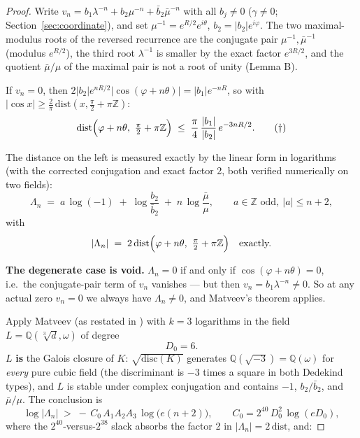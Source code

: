 \documentclass[11pt]{amsart}
\theoremstyle{plain}
\theoremstyle{remark}
\begin{document}
\begin{proof}
Write $v_n = b_1\lambda^{-n} + b_2\mu^{-n} + \bar b_2\bar\mu^{-n}$
with all $b_j \ne 0$ ($\gamma \ne 0$;
Section~\ref{sec:coordinate}), and set
$\mu^{-1} = e^{R/2}e^{i\theta}$, $b_2 = |b_2|e^{i\varphi}$. The two
maximal-modulus roots of the reversed recurrence are the conjugate
pair $\mu^{-1}, \bar\mu^{-1}$ (modulus $e^{R/2}$), the third root
$\lambda^{-1}$ is smaller by the exact factor $e^{3R/2}$, and the
quotient $\bar\mu/\mu$ of the maximal pair is not a root of unity
(Lemma B).

If $v_n = 0$, then
$2|b_2|e^{nR/2}|\cos(\varphi + n\theta)| = |b_1|e^{-nR}$, so with
$|\cos x| \ge \tfrac{2}{\pi}\,\mathrm{dist}(x, \tfrac{\pi}{2} +
\pi\mathbb{Z})$:
\begin{equation}
\mathrm{dist}\Bigl(\varphi + n\theta,\ \tfrac{\pi}{2} +
\pi\mathbb{Z}\Bigr)
\;\le\; \frac{\pi}{4}\,\frac{|b_1|}{|b_2|}\,e^{-3nR/2}.
\tag{$\dagger$}
\end{equation}

The distance on the left is measured exactly by the linear form in
logarithms (with the corrected conjugation and exact factor 2, both
verified numerically on two fields):
\[
\Lambda_n \;=\; a\,\log(-1) \;+\; \log\!\frac{b_2}{\bar b_2}
\;+\; n\,\log\!\frac{\bar\mu}{\mu},
\qquad a \in \mathbb{Z} \text{ odd},\ |a| \le n + 2,
\]
with
\[
|\Lambda_n| \;=\; 2\,\mathrm{dist}\Bigl(\varphi + n\theta,\
\tfrac{\pi}{2} + \pi\mathbb{Z}\Bigr)
\quad\text{exactly.}
\]

\textbf{The degenerate case is void.} $\Lambda_n = 0$ if and only if
$\cos(\varphi + n\theta) = 0$, i.e.\ the conjugate-pair term of $v_n$
vanishes --- but then $v_n = b_1\lambda^{-n} \ne 0$. So at any actual
zero $v_n = 0$ we always have $\Lambda_n \ne 0$, and Matveev's
theorem applies.

Apply Matveev \cite{Mat00} (as restated in \cite[\S 2.4]{Sha19}) with
$k = 3$ logarithms in the field
$L = \mathbb{Q}(\sqrt[3]{d}, \omega)$ of degree
\[
D_0 = 6.
\]
$L$ \textbf{is} the Galois closure of $K$: $\sqrt{\mathrm{disc}(K)}$
generates $\mathbb{Q}(\sqrt{-3}) = \mathbb{Q}(\omega)$ for
\emph{every} pure cubic field (the discriminant is $-3$ times a
square in both Dedekind types), and $L$ is stable under complex
conjugation and contains $-1$, $b_2/\bar b_2$, and $\bar\mu/\mu$. The
conclusion is
\[
\log|\Lambda_n| \;>\; -\,C_0\,A_1A_2A_3\,\log\bigl(e(n+2)\bigr),
\qquad C_0 = 2^{40}\,D_0^2\,\log(eD_0),
\]
where the $2^{40}$-versus-$2^{38}$ slack absorbs the factor 2 in
$|\Lambda_n| = 2\,\mathrm{dist}$, and:


\end{proof}
\end{document}
